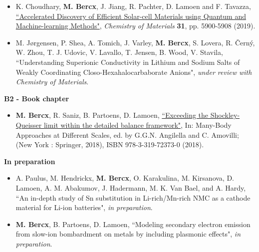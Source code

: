 \begin{itemize}
\item K. Choudhary, \textbf{M. Bercx}, J. Jiang, R. Pachter, D. Lamoen and F. Tavazza, \href{https://doi.org/10.1021/ACS.CHEMMATER.9B02166
}{``Accelerated Discovery of Efficient Solar-cell Materials using Quantum and Machine-learning Methods"}, \textit{Chemistry of Materials} \textbf{31}, pp. 5900-5908 (2019). 

\item M. J{\o}rgensen, P. Shea, A. Tomich, J. Varley, \textbf{M. Bercx}, S. Lovera, R. \v{C}ern\'{y}, W. Zhou, T. J. Udovic, V. Lavallo, T. Jensen, B. Wood, V. Stavila, ``Understanding Superionic Conductivity in Lithium and Sodium Salts of Weakly Coordinating Closo-Hexahalocarbaborate Anions", \textit{under review with Chemistry of Materials}.

\end{itemize}

\textbf{B2 - Book chapter}

\begin{itemize}

\item \textbf{M. Bercx}, R. Saniz, B. Partoens, D. Lamoen, \href{https://link.springer.com/chapter/10.1007/978-3-319-72374-7_15}{``Exceeding the Shockley-Queisser limit within the detailed balance framework"}, In: Many-Body Approaches at Different Scales, ed. by G.G.N. Angilella and C. Amovilli; (New York : Springer, 2018), ISBN 978-3-319-72373-0 (2018).

\end{itemize}

\textbf{In preparation}

\begin{itemize}

\item A. Paulus, M. Hendrickx, \textbf{M. Bercx}, O. Karakulina, M. Kirsanova, D. Lamoen, A. M. Abakumov, J. Hadermann, M. K. Van Bael, and A. Hardy, ``An in-depth study of Sn substitution in Li-rich/Mn-rich NMC as a cathode material for Li-ion batteries", \textit{in preparation}.

\item \textbf{M. Bercx}, B. Partoens, D. Lamoen, ``Modeling secondary electron emission from slow-ion bombardment on metals by including plasmonic effects", \textit{in preparation}.

\end{itemize}
